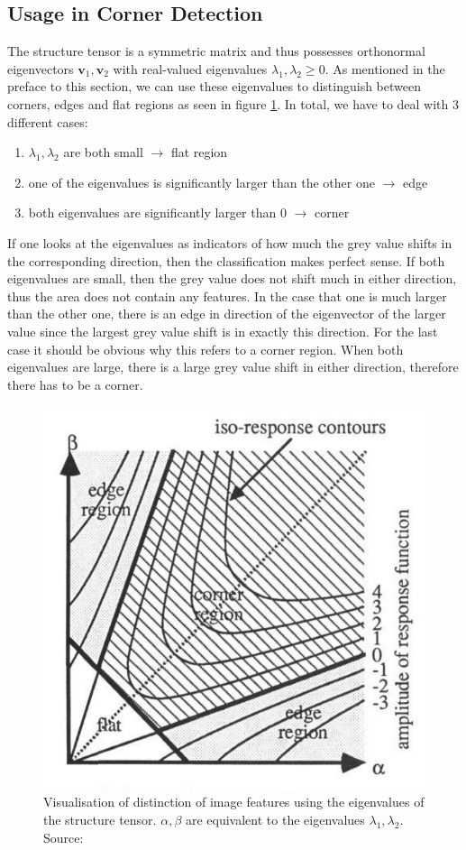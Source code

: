 \subsection{Usage in Corner Detection}\label{sub:Corner}
The structure tensor is a symmetric matrix and thus possesses orthonormal eigenvectors $\boldsymbol v_1,
\boldsymbol v_2$ with real-valued eigenvalues $\lambda_1, \lambda_2 \geq 0$. \cite{ipcv19-13} As
mentioned in the preface to this section, we can use these eigenvalues to distinguish between
corners, edges and flat regions as seen in figure \ref{fig:Structure}.
In total, we have to deal with 3 different cases:
\begin{enumerate}
    \item $\lambda_1, \lambda_2$ are both small $\rightarrow$ flat region
    \item one of the eigenvalues is significantly larger than the other one $\rightarrow$ edge
    \item both eigenvalues are significantly larger than 0 $\rightarrow$ corner
\end{enumerate}
If one looks at the eigenvalues as indicators of how much the grey value shifts in the
corresponding
direction, then the classification makes perfect sense. If both eigenvalues are small, then the
grey value does not shift much in either direction, thus the area does not contain any features.
In the case that one is much larger than the other one, there is an edge in direction of the
eigenvector of the larger value since the largest grey value shift is in exactly this direction.
For the last case it should be obvious why this refers to a corner region. When both eigenvalues
are large, there is a large grey value shift in either direction, therefore there has to be a
corner.\\
\begin{figure}[h]
    \centering
    \includegraphics[width=0.6\linewidth]{../Images/structure_tensor.png}
    \caption{Visualisation of distinction of image features using the eigenvalues of the structure
        tensor. $\alpha, \beta$ are equivalent to the eigenvalues $\lambda_1, \lambda_2$. Source: \cite{harris88}}\label{fig:Structure}
\end{figure}
